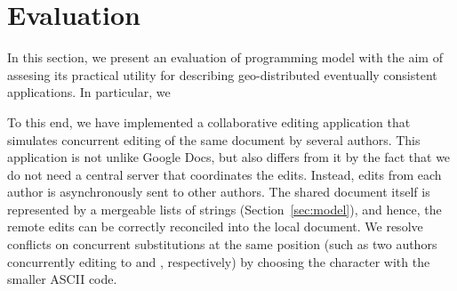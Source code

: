 \section{Evaluation}
\label{sec:evaluation}

In this section, we present an evaluation of \name programming model with the
aim of assesing its practical utility for describing geo-distributed eventually
consistent applications. In particular, we

To this end, we have implemented a collaborative editing application that
simulates concurrent editing of the same document by several authors. This
application is not unlike Google Docs, but also differs from it by the fact
that we do not need a central server that coordinates the edits. Instead, edits
from each author is asynchronously sent to other authors. The shared document
itself is represented by a mergeable lists of strings
(Section~\ref{sec:model}), and hence, the remote edits can be correctly
reconciled into the local document. We resolve conflicts on concurrent
substitutions at the same position (such as two authors concurrently editing
 to  and , respectively) by choosing the character with
the smaller ASCII code.
